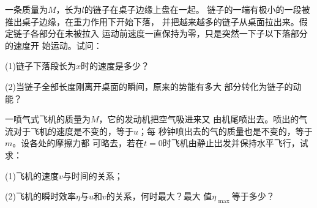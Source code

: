 \begin{exercises}
\exercise 一条质量为$ M $，长为$ l $的链子在桌子边缘上盘在一起。
链子的一端有极小的一段被推出桌子边缘，在重力作用下开始下落，
并把越来越多的链子从桌面拉出来。假定链子各部分在未被拉入
运动前速度一直保持为零，只是突然一下子以下落部分的速度开
始运动。试问：

(1)链子下落段长为$ x $时的速度是多少？

(2)当链子全部长度刚离开桌面的瞬间，原来的势能有多大
部分转化为链子的动能？

\exercise 一喷气式飞机的质量为$ M $，它的发动机把空气吸进来又
由机尾喷出去。喷出的气流对于飞机的速度是不变的，等于$ u $；每
秒钟喷出去的气的质量也是不变的，等于$ m $。设各处的摩擦力都
可略去，若在$ t = 0 $时飞机由静止出发并保持水平飞行，试求：

(1)飞机的速度$ v $与时间的关系；

(2)飞机的瞬时效率$ \eta $与$ u $和$ v $的关系，何时最大？最大
值$ \eta _ { \text { max } } $等于多少？

\end{exercises}